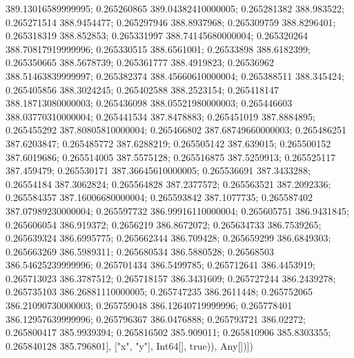 389.13016589999995; 0.265260865 389.04382410000005; 0.265281382 388.983522; 0.265271514 388.9454477; 0.265297946 388.8937968; 0.265309759 388.8296401; 0.265318319 388.852853; 0.265331997 388.74145680000004; 0.265320264 388.70817919999996; 0.265330515 388.6561001; 0.26533898 388.6182399; 0.265350665 388.5678739; 0.265361777 388.4919823; 0.26536962 388.51463839999997; 0.265382374 388.45660610000004; 0.265388511 388.345424; 0.265405856 388.3024245; 0.265402588 388.2523154; 0.265418147 388.18713080000003; 0.265436098 388.05521980000003; 0.265446603 388.03770310000004; 0.265441534 387.8478883; 0.265451019 387.8884895; 0.265455292 387.80805810000004; 0.265466802 387.68749660000003; 0.265486251 387.6203847; 0.265485772 387.6288219; 0.265505142 387.639015; 0.265500152 387.6019686; 0.265514005 387.5575128; 0.265516875 387.5259913; 0.265525117 387.459479; 0.265530171 387.36645610000005; 0.265536691 387.3433288; 0.26554184 387.3062824; 0.265564828 387.2377572; 0.265563521 387.2092336; 0.265584357 387.16006680000004; 0.265593842 387.1077735; 0.265587402 387.07989230000004; 0.265597732 386.99916110000004; 0.265605751 386.9431845; 0.265606054 386.919372; 0.2656219 386.8672072; 0.265634733 386.7539265; 0.265639324 386.6995775; 0.265662344 386.709428; 0.265659299 386.6849303; 0.265663269 386.5989311; 0.265680534 386.5880528; 0.26568503 386.54625239999996; 0.265701434 386.5499785; 0.265712641 386.4453919; 0.265713023 386.3787512; 0.265718157 386.3431609; 0.265727244 386.2439278; 0.265735103 386.26881110000005; 0.265747235 386.2611448; 0.265752065 386.21090730000003; 0.265759048 386.12640719999996; 0.265778401 386.12957639999996; 0.265796367 386.0476888; 0.265793721 386.02272; 0.265800417 385.9939394; 0.265816502 385.909011; 0.265810906 385.8303355; 0.265840128 385.796801], ["x", "y"], Int64[], true)), Any[])])
